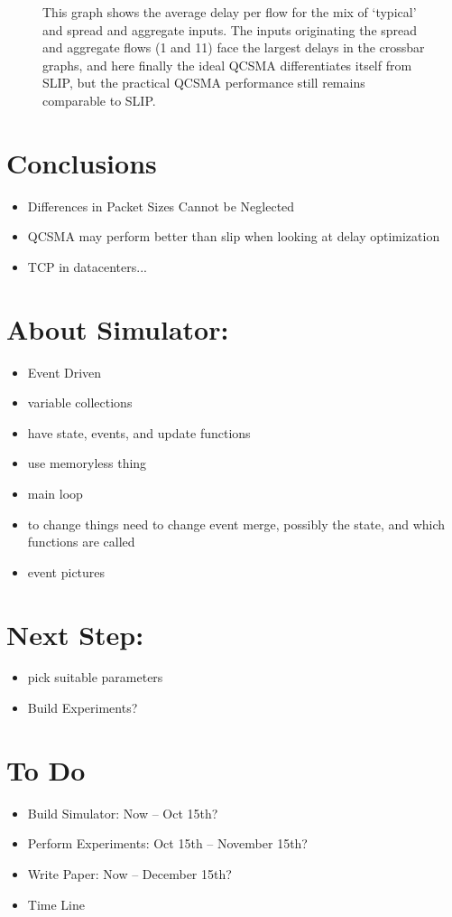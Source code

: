 \documentclass{IEEEtran}%
\begin{document}
\begin{figure}%
	\caption{This graph shows the average delay per flow for the mix of `typical' and spread and aggregate inputs.  The inputs originating the spread and aggregate flows (1 and 11) face the largest delays in the crossbar graphs, and here finally the ideal QCSMA differentiates itself from SLIP, but the practical QCSMA performance still remains comparable to SLIP.}
	\label{mixed_delay_matrix}
\end{figure}



\section{Conclusions}
\begin{itemize}
\item Differences in Packet Sizes Cannot be Neglected
\item QCSMA may perform better than slip when looking at delay optimization
\item TCP in datacenters...
\end{itemize}

\section{About Simulator:}
\begin{itemize}
\item Event Driven
\item variable collections
\item have state, events, and update functions
\item use memoryless thing
\item main loop
\item to change things need to change event merge, possibly the state, and which functions are called
\item event pictures
\end{itemize}

\section{Next Step:}
\begin{itemize}
\item pick suitable parameters
\item Build Experiments?
\end{itemize}
\section{To Do}
\begin{itemize}
\item Build Simulator: Now -- Oct 15th?
\item Perform Experiments: Oct 15th -- November 15th?
\item Write Paper: Now -- December 15th?
\item Time Line
\end{itemize}
\end{document}

